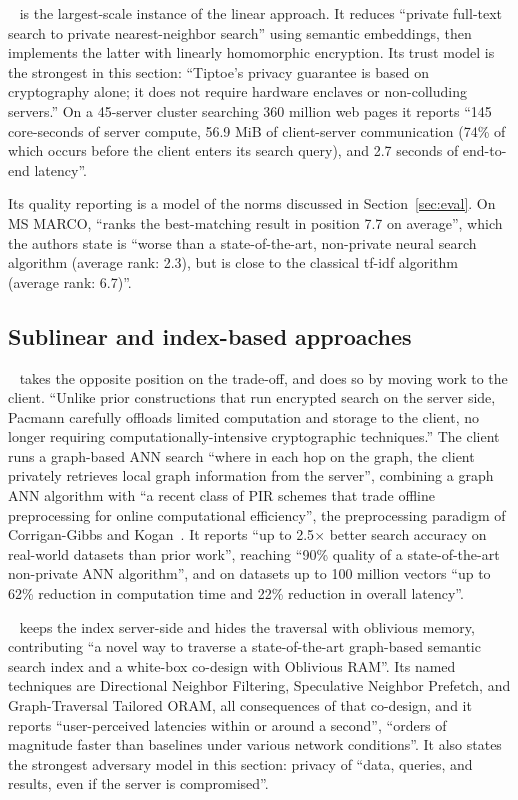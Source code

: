 \tiptoe~\cite{tiptoe2023} is the largest-scale instance of the linear approach. It reduces
``private full-text search to private nearest-neighbor search'' using semantic embeddings, then
implements the latter with linearly homomorphic encryption. Its trust model is the strongest in
this section: ``Tiptoe's privacy guarantee is based on cryptography alone; it does not require
hardware enclaves or non-colluding servers.'' On a 45-server cluster searching 360 million web
pages it reports ``145 core-seconds of server compute, 56.9 MiB of client-server communication
(74\% of which occurs before the client enters its search query), and 2.7 seconds of end-to-end
latency''.

Its quality reporting is a model of the norms discussed in Section~\ref{sec:eval}. On MS MARCO,
\tiptoeplain{} ``ranks the best-matching result in position 7.7 on average'', which the authors
state is ``worse than a state-of-the-art, non-private neural search algorithm (average rank: 2.3),
but is close to the classical tf-idf algorithm (average rank: 6.7)''.

\subsection{Sublinear and index-based approaches}
\label{sec:retrieval:sublinear}

\pacmann~\cite{pacmann2025} takes the opposite position on the trade-off, and does so by moving
work to the client. ``Unlike prior constructions that run encrypted search on the server side,
Pacmann carefully offloads limited computation and storage to the client, no longer requiring
computationally-intensive cryptographic techniques.'' The client runs a graph-based ANN search
``where in each hop on the graph, the client privately retrieves local graph information from the
server'', combining a graph ANN algorithm with ``a recent class of PIR schemes that trade offline
preprocessing for online computational efficiency'', the preprocessing paradigm of
Corrigan-Gibbs and Kogan~\cite{cgk2020}. It reports ``up to 2.5$\times$ better search accuracy on
real-world datasets than prior work'', reaching ``90\% quality of a state-of-the-art non-private
ANN algorithm'', and on datasets up to 100 million vectors ``up to 62\% reduction in computation
time and 22\% reduction in overall latency''.

\compass~\cite{compass2025} keeps the index server-side and hides the traversal with oblivious
memory, contributing ``a novel way to traverse a state-of-the-art graph-based semantic search
index and a white-box co-design with Oblivious RAM''. Its named techniques are Directional
Neighbor Filtering, Speculative Neighbor Prefetch, and Graph-Traversal Tailored ORAM, all
consequences of that co-design, and it reports ``user-perceived latencies within or around a
second'', ``orders of magnitude faster than baselines under various network conditions''. It also
states the strongest adversary model in this section: privacy of ``data, queries, and results,
even if the server is compromised''.

